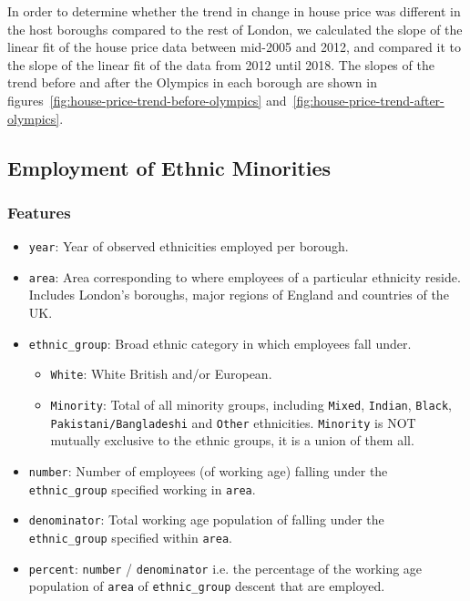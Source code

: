 \documentclass[12pt,twoside]{article}
\begin{document}
In order to determine whether the trend in change in house price was different in the host boroughs compared to the rest of London, we calculated the slope of the linear fit of the house price data between mid-2005 and 2012, and compared it to the slope of the linear fit of the data from 2012 until 2018. The slopes of the trend before and after the Olympics in each borough are shown in figures~\ref{fig:house-price-trend-before-olympics} and~\ref{fig:house-price-trend-after-olympics}.
\raggedbottom

\subsection{Employment of Ethnic Minorities}
\subsubsection{Features}
\begin{itemize}
    \item \texttt{year}: Year of observed ethnicities employed per borough.
    \item \texttt{area}: Area corresponding to where employees of a particular ethnicity reside. Includes London's boroughs, major regions of England and countries of the UK.
    \item \texttt{ethnic\_group}: Broad ethnic category in which employees fall under.
    \begin{itemize}
        \item \texttt{White}: White British and/or European.
        \item \texttt{Minority}: Total of all minority groups, including \texttt{Mixed}, \texttt{Indian}, \texttt{Black},  \texttt{Pakistani/Bangladeshi} and \texttt{Other} ethnicities. \texttt{Minority} is NOT mutually exclusive to the ethnic groups, it is a union of them all.
      \end{itemize}
    \item \texttt{number}: Number of employees (of working age) falling under the \texttt{ethnic\_group} specified working in \texttt{area}.
    \item \texttt{denominator}: Total working age population of falling under the \texttt{ethnic\_group} specified within \texttt{area}.
    \item \texttt{percent}: \texttt{number} / \texttt{denominator} i.e. the percentage of the working age population of \texttt{area} of \texttt{ethnic\_group} descent that are employed.
\end{itemize}
\end{document}

